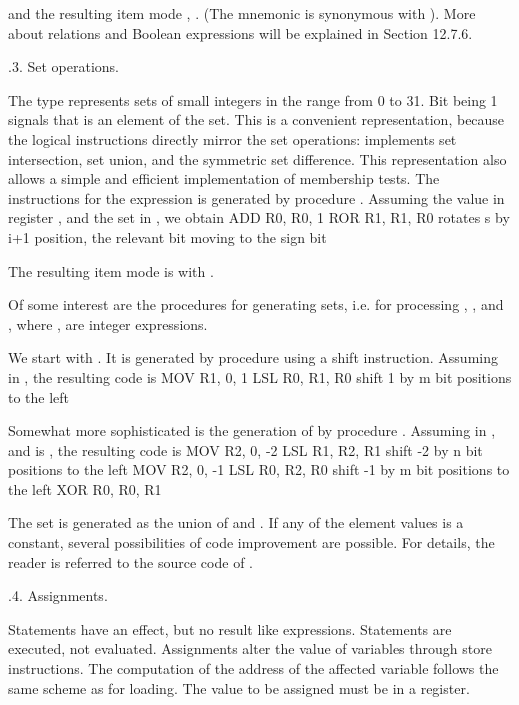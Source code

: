 \noindent and the resulting item mode , . (The mne\-monic  is synonymous with ). More about relations and Boolean expressions will be explained in Section 12.7.6.

.3. Set operations.

The type  represents sets of small integers in the range from 0 to 31. Bit  being 1 signals that  is an element of the set. This is a convenient representation, because the logical instructions directly mirror the set operations:  implements set intersection,  set union, and  the symmetric set difference. This representation also allows a simple and efficient implementation of membership tests. The instructions for the expression  is generated by procedure . Assuming the value  in register , and the set  in , we obtain
\begintt
ADD R0, R0, 1
ROR R1, R1, R0  rotates s by i+1 position, the relevant bit
                moving to the sign bit
\endtt

\noindent The resulting item mode is  with .

Of some interest are the procedures for generating sets, i.e. for processing , , and , where ,  are integer expressions.

We start with . It is generated by procedure  using a shift instruction. Assuming  in , the resulting code is
\begintt
MOV R1, 0, 1
LSL R0, R1, R0 shift 1 by m bit positions to the left
\endtt

\noindent Somewhat more sophisticated is the generation of  by procedure . Assuming  in , and  is , the resulting code is
\begintt
MOV R2, 0, -2
LSL R1, R2, R1 shift -2 by n bit positions to the left
MOV R2, 0, -1
LSL R0, R2, R0 shift -1 by m bit positions to the left
XOR R0, R0, R1
\endtt

\noindent The set  is generated as the union of  and . If any of the element values is a constant, several possibilities of code improvement are possible. For details, the reader is referred to the source code of .

.4. Assignments.

Statements have an effect, but no result like expressions. Statements are executed, not evaluated. Assignments alter the value of variables through store instructions. The computation of the address of the affected variable follows the same scheme as for loading. The value to be assigned must be in a register.


